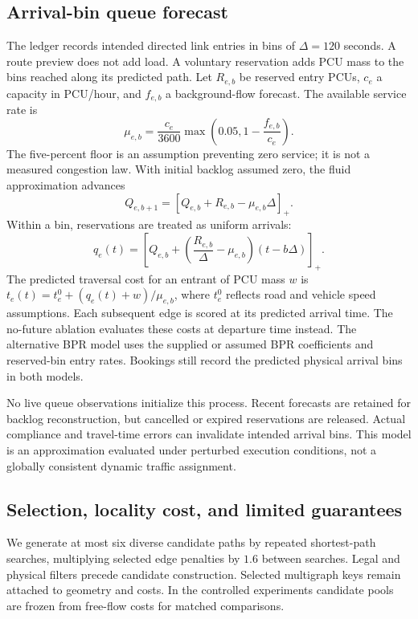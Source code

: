 \documentclass[sigconf,anonymous,review]{acmart}
\begin{document}
\subsection{Arrival-bin queue forecast}
The ledger records intended directed link entries in bins of $\Delta=120$ seconds. A route preview does not add load. A voluntary reservation adds PCU mass to the bins reached along its predicted path. Let $R_{e,b}$ be reserved entry PCUs, $c_e$ a capacity in PCU/hour, and $f_{e,b}$ a background-flow forecast. The available service rate is
\begin{equation}
 \mu_{e,b}=\frac{c_e}{3600}\max\left(0.05,1-\frac{f_{e,b}}{c_e}\right).
\end{equation}
The five-percent floor is an assumption preventing zero service; it is not a measured congestion law. With initial backlog assumed zero, the fluid approximation advances
\begin{equation}
 Q_{e,b+1}=\left[Q_{e,b}+R_{e,b}-\mu_{e,b}\Delta\right]_+.
\end{equation}
Within a bin, reservations are treated as uniform arrivals:
\begin{equation}
 q_e(t)=\left[Q_{e,b}+\left(\frac{R_{e,b}}{\Delta}-\mu_{e,b}\right)(t-b\Delta)\right]_+.
\end{equation}
The predicted traversal cost for an entrant of PCU mass $w$ is $t_e(t)=t_e^0+(q_e(t)+w)/\mu_{e,b}$, where $t_e^0$ reflects road and vehicle speed assumptions. Each subsequent edge is scored at its predicted arrival time. The no-future ablation evaluates these costs at departure time instead. The alternative BPR model uses the supplied or assumed BPR coefficients and reserved-bin entry rates. Bookings still record the predicted physical arrival bins in both models.

No live queue observations initialize this process. Recent forecasts are retained for backlog reconstruction, but cancelled or expired reservations are released. Actual compliance and travel-time errors can invalidate intended arrival bins. This model is an approximation evaluated under perturbed execution conditions, not a globally consistent dynamic traffic assignment.

\subsection{Selection, locality cost, and limited guarantees}
We generate at most six diverse candidate paths by repeated shortest-path searches, multiplying selected edge penalties by $1.6$ between searches. Legal and physical filters precede candidate construction. Selected multigraph keys remain attached to geometry and costs. In the controlled experiments candidate pools are frozen from free-flow costs for matched comparisons.
\end{document}
